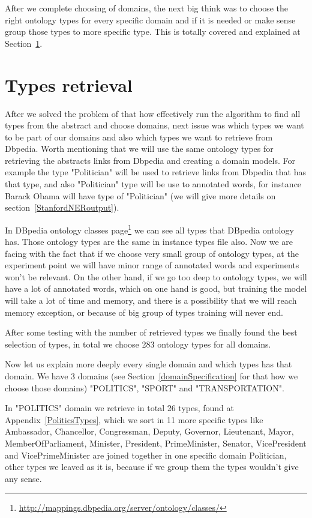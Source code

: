 \documentclass[thesis=M,english]{FITthesis}[2018/05/30]
\begin{document}
After we complete choosing of domains, the next big think was to choose the right ontology types for every specific domain and if it is needed or make sense group those types to more specific type. This is totally covered and explained at Section~\ref{typesRetrieval}. 

\section{Types retrieval}\label{typesRetrieval}
	After we solved the problem of that how effectively run the algorithm to find all types from the abstract and choose domains, next issue was which types we want to be part of our domains and also which types we want to retrieve from Dbpedia. Worth mentioning that we will use the same ontology types for retrieving the abstracts links from Dbpedia and creating a domain models. For example the type "Politician" will be used to retrieve links from Dbpedia that has that type, and also "Politician" type will be use to annotated words, for instance Barack Obama will have type of "Politician" (we will give more details on section~\ref{StanfordNERoutput}).

	In DBpedia ontology classes page\footnote{\url{http://mappings.dbpedia.org/server/ontology/classes/}} we can see all types that DBpedia ontology has. Those ontology types are the same in instance types file also. Now we are facing with the fact that if we choose very small group of ontology types, at the experiment point we will have minor range of annotated words and experiments won't be relevant. On the other hand, if we go too deep to ontology types, we will have a lot of annotated words, which on one hand is good, but training the model will take a lot of time and memory, and there is a possibility that we will reach memory exception, or because of big group of types training will never end.  

After some testing with the number of retrieved types we finally found the best selection of types, in total we choose 283 ontology types for all domains.

Now let us explain more deeply every single domain and which types has that domain. We have 3 domains (see Section~\ref{domainSpecification} for that how we choose those domains) "POLITICS", "SPORT" and "TRANSPORTATION".

In "POLITICS" domain we retrieve in total 26 types, found at Appendix~\ref{PoliticsTypes}, which we sort in 11 more specific types like Ambassador, Chancellor, Congressman, Deputy, Governor, Lieutenant, Mayor, MemberOfParliament, Minister, President, PrimeMinister, Senator, VicePresident and VicePrimeMinister are joined together in one specific domain Politician, other types we leaved as it is, because if we group them the types wouldn't give any sense.  
\end{document}
